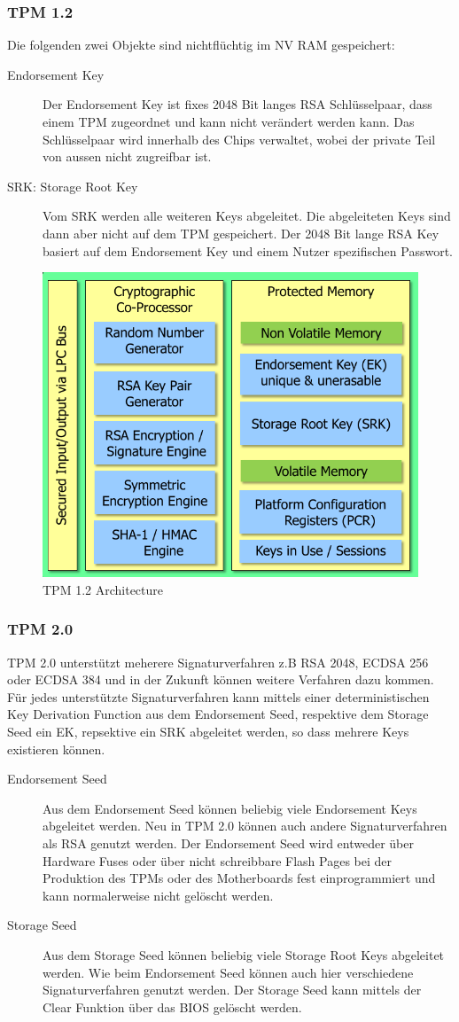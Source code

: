 \subsubsection{TPM 1.2}
Die folgenden zwei Objekte sind nichtflüchtig im NV RAM gespeichert:
\begin{description}
	\item[Endorsement Key] Der Endorsement Key ist fixes 2048 Bit langes RSA Schlüsselpaar, dass einem TPM zugeordnet und kann nicht verändert werden kann. Das Schlüsselpaar wird innerhalb des Chips verwaltet, wobei der private Teil von aussen nicht zugreifbar ist. 
	\item[SRK: Storage Root Key] Vom SRK werden alle weiteren Keys abgeleitet. Die abgeleiteten Keys sind dann aber nicht auf dem TPM gespeichert. Der 2048 Bit lange RSA Key basiert auf dem Endorsement Key und einem Nutzer spezifischen Passwort. 
\end{description}
\begin{figure}[h]
	\centering
	\includegraphics[width=0.45\linewidth]{images/tpm12.png}
	\caption{TPM 1.2 Architecture}
	\label{fig:tpm12architecture}
\end{figure}

\subsubsection{TPM 2.0}
TPM 2.0 unterstützt meherere Signaturverfahren z.B RSA 2048, ECDSA 256 oder ECDSA 384 und in der Zukunft können weitere Verfahren dazu kommen. Für jedes unterstützte Signaturverfahren kann mittels einer deterministischen Key Derivation Function aus dem Endorsement Seed, respektive dem Storage Seed ein EK, repsektive ein SRK abgeleitet werden, so dass mehrere Keys existieren können.
\begin{description}
    \item[Endorsement Seed] Aus dem Endorsement Seed können beliebig viele Endorsement Keys abgeleitet werden. Neu in TPM 2.0 können auch andere Signaturverfahren als RSA genutzt werden. Der Endorsement Seed wird entweder über Hardware Fuses oder über nicht schreibbare Flash Pages bei der Produktion des TPMs oder des Motherboards fest einprogrammiert und kann normalerweise nicht gelöscht werden.
    \item[Storage Seed] Aus dem Storage Seed können beliebig viele Storage Root Keys abgeleitet werden. Wie beim Endorsement Seed können auch hier verschiedene Signaturverfahren genutzt werden. Der Storage Seed kann mittels der Clear Funktion über das BIOS gelöscht werden.
\end{description}

